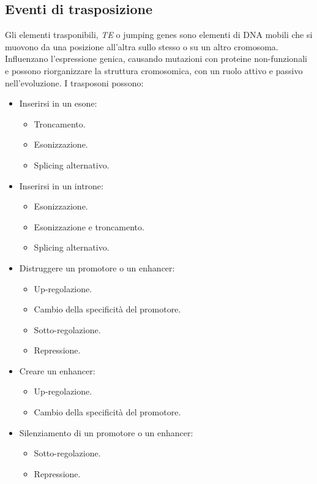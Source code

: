 	\subsection{Eventi di trasposizione}
	Gli elementi trasponibili, \emph{TE} o jumping genes sono elementi di DNA mobili che si muovono da una posizione all'altra sullo stesso o su un altro cromosoma.
	Influenzano l'espressione genica, causando mutazioni con proteine non-funzionali e possono riorganizzare la struttura cromosomica, con un ruolo attivo e passivo nell'evoluzione.
	I trasposoni possono:
	\begin{multicols}{2}
		\begin{itemize}
			\item Inserirsi in un esone:
				\begin{itemize}
					\item Troncamento.
					\item Esonizzazione.
					\item Splicing alternativo.
				\end{itemize}
			\item Inserirsi in un introne:
				\begin{itemize}
					\item Esonizzazione.
					\item Esonizzazione e troncamento.
					\item Splicing alternativo.
				\end{itemize}
			\item Distruggere un promotore o un enhancer:
				\begin{itemize}
					\item Up-regolazione.
					\item Cambio della specificit\`a del promotore.
					\item Sotto-regolazione.
					\item Repressione.
				\end{itemize}
			\item Creare un enhancer:
				\begin{itemize}
					\item Up-regolazione.
					\item Cambio della specificit\`a del promotore.
				\end{itemize}
			\item Silenziamento di un promotore o un enhancer:
				\begin{itemize}
					\item Sotto-regolazione.
					\item Repressione.
				\end{itemize}
		\end{itemize}
	\end{multicols}

